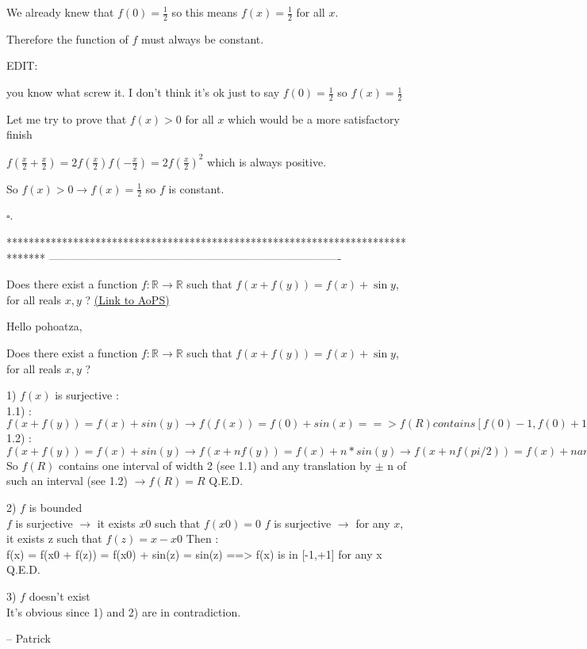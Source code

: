 \begin{mysolution}
We already knew that $f(0) = \frac{1}{2}$ so this means $f(x) = \frac{1}{2}$ for all $x$.

Therefore the function of $f$ must always be constant.

EDIT:


you know what screw it. I don't think it's ok just to say $f(0) = \frac{1}{2}$ so $f(x) = \frac{1}{2}$ 

Let me try to prove that $f(x) > 0$ for all $x$ which would be a more satisfactory finish

$f(\frac{x}{2} + \frac{x}{2}) = 2f(\frac{x}{2})f(-\frac{x}{2}) = 2f(\frac{x}{2})^2$ which is always positive.

So $f(x) > 0 \rightarrow f(x) = \frac{1}{2}$ so $f$ is constant. 

$\square$.
\end{mysolution}
*******************************************************************************
-------------------------------------------------------------------------------

\begin{problem}
	Does there exist a function $f: \mathbb{R}\rightarrow\mathbb{R}$ such that $f(x+f(y))=f(x)+\sin y$, for all reals $x,y$ ?
	\flushright \href{https://artofproblemsolving.com/community/c6h145741}{(Link to AoPS)}
\end{problem}



\begin{mysolution}
	Hello pohoatza,
\begin{tcolorbox}Does there exist a function $f: \mathbb{R}\rightarrow\mathbb{R}$ such that $f(x+f(y))=f(x)+\sin y$, for all reals $x,y$ ?\end{tcolorbox}

1) $f(x)$ is surjective :\\
1.1) : $f(x+f(y)) = f(x) + sin(y)\rightarrow f(f(x)) = f(0) + sin(x) ==> f(R) contains [f(0)-1,f(0)+1]$ \\
1.2) : $f(x+f(y)) = f(x) + sin(y) \rightarrow f(x+nf(y)) = f(x) + n*sin(y) \rightarrow f(x+nf(pi/2)) = f(x)+n and f(x+nf(-pi/2)) = f(x)-n $ \\

So $f(R)$ contains one interval of width 2 (see 1.1) and any translation by $\pm$ n of such an interval (see 1.2) $\rightarrow f(R) = R$
Q.E.D.

2) $f$ is bounded \\
$f$ is surjective $\rightarrow$ it exists $x0$ such that $f(x0) = 0$
$f$ is surjective $\rightarrow$ for any $x$, it exists z such that $f(z) = x-x0$
Then : \\
f(x) = f(x0 + f(z)) = f(x0) + sin(z) = sin(z) ==> f(x) is in [-1,+1] for any x
Q.E.D.

3) $f$ doesn't exist \\
It's obvious since 1) and 2) are in contradiction.

-- 
Patrick
\end{mysolution}



